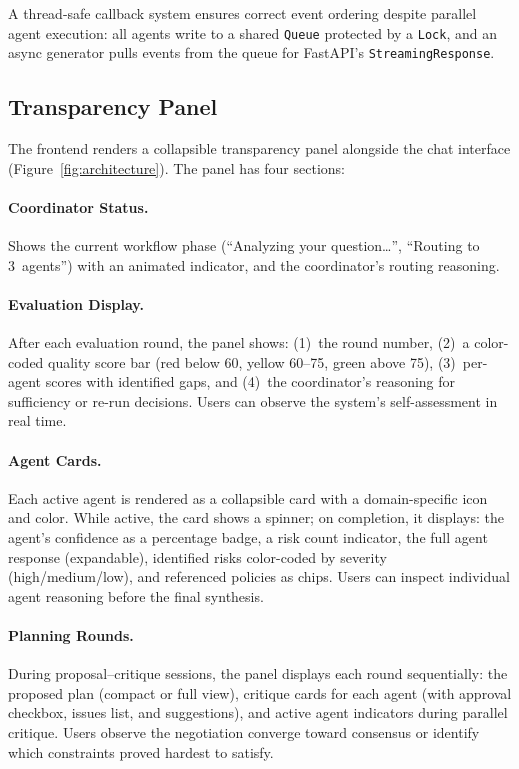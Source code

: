 A thread-safe callback system ensures correct event ordering despite parallel agent execution: all agents write to a shared \texttt{Queue} protected by a \texttt{Lock}, and an async generator pulls events from the queue for FastAPI's \texttt{StreamingResponse}.

\subsection{Transparency Panel}

The frontend renders a collapsible transparency panel alongside the chat interface (Figure~\ref{fig:architecture}). The panel has four sections:

\paragraph{Coordinator Status.} Shows the current workflow phase (``Analyzing your question\ldots'', ``Routing to 3~agents'') with an animated indicator, and the coordinator's routing reasoning.

\paragraph{Evaluation Display.} After each evaluation round, the panel shows: (1)~the round number, (2)~a color-coded quality score bar (red below 60, yellow 60--75, green above 75), (3)~per-agent scores with identified gaps, and (4)~the coordinator's reasoning for sufficiency or re-run decisions. Users can observe the system's self-assessment in real time.

\paragraph{Agent Cards.} Each active agent is rendered as a collapsible card with a domain-specific icon and color. While active, the card shows a spinner; on completion, it displays: the agent's confidence as a percentage badge, a risk count indicator, the full agent response (expandable), identified risks color-coded by severity (high/medium/low), and referenced policies as chips. Users can inspect individual agent reasoning before the final synthesis.

\paragraph{Planning Rounds.} During proposal--critique sessions, the panel displays each round sequentially: the proposed plan (compact or full view), critique cards for each agent (with approval checkbox, issues list, and suggestions), and active agent indicators during parallel critique. Users observe the negotiation converge toward consensus or identify which constraints proved hardest to satisfy.


